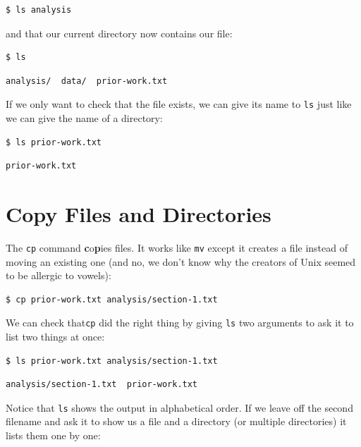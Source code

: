 \documentclass[
]{krantz}
\begin{document}
\begin{verbatim}
$ ls analysis
\end{verbatim}

and that our current directory now contains our file:

\begin{verbatim}
$ ls
\end{verbatim}

\begin{verbatim}
analysis/  data/  prior-work.txt
\end{verbatim}

If we only want to check that the file exists,
we can give its name to \texttt{ls}
just like we can give the name of a directory:

\begin{verbatim}
$ ls prior-work.txt
\end{verbatim}

\begin{verbatim}
prior-work.txt
\end{verbatim}

\hypertarget{bash-basics-copy}{%
\section{Copy Files and Directories}\label{bash-basics-copy}}

The \texttt{cp} command \textbf{c}o\textbf{p}ies files.
It works like \texttt{mv} except it creates a file instead of moving an existing one
(and no, we don't know why the creators of Unix seemed to be allergic to vowels):

\begin{verbatim}
$ cp prior-work.txt analysis/section-1.txt
\end{verbatim}

We can check that\texttt{cp} did the right thing
by giving \texttt{ls} two arguments
to ask it to list two things at once:

\begin{verbatim}
$ ls prior-work.txt analysis/section-1.txt
\end{verbatim}

\begin{verbatim}
analysis/section-1.txt  prior-work.txt
\end{verbatim}

Notice that \texttt{ls} shows the output in alphabetical order.
If we leave off the second filename and ask it to show us a file and a directory
(or multiple directories)
it lists them one by one:
\end{document}
